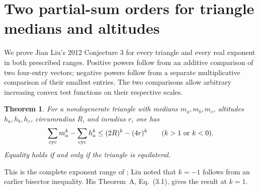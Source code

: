 \documentclass[11pt,a4paper]{article}
\numberwithin{equation}{section}
\newtheorem{theorem}{Theorem}[section]
\theoremstyle{definition}
\theoremstyle{remark}
\newenvironment{sectionabstract}{\par\smallskip\begingroup\small\noindent}{\par\endgroup\medskip}
\begin{document}
\par\endgroup

\begingroup
\newcommand{\dd}{\Delta}
\newcommand{\SSS}{S_j}
\section{\texorpdfstring{Two partial-sum orders for triangle medians and altitudes}{Two partial-sum orders for triangle medians and altitudes}}\label{section:r37reiwa}
\par\medskip


\begin{sectionabstract}
We prove Jian Liu's 2012 Conjecture 3 for every triangle and every real exponent in both prescribed ranges. Positive powers follow from an additive comparison of two four-entry vectors; negative powers follow from a separate multiplicative comparison of their smallest entries. The two comparisons allow arbitrary increasing convex test functions on their respective scales.
\end{sectionabstract}
\begin{theorem}\label{r37reiwa:pow}
For a nondegenerate triangle with medians $m_a,m_b,m_c$, altitudes $h_a,h_b,h_c$, circumradius $R$, and inradius $r$, one has
\[
  \sum_{\rm cyc}m_a^k-\sum_{\rm cyc}h_a^k
      \le (2R)^k-(4r)^k\qquad (k>1\ \text{or}\ k<0).
\]
Equality holds if and only if the triangle is equilateral.
\end{theorem}
\noindent This is the complete exponent range of \cite[Conj.~3, Eq.~(4.3)]{r37reiwa:Liu}; Liu noted that $k=-1$ follows from an earlier bisector inequality. His Theorem~A, Eq.~(3.1), gives the result at $k=1$.
\end{document}
